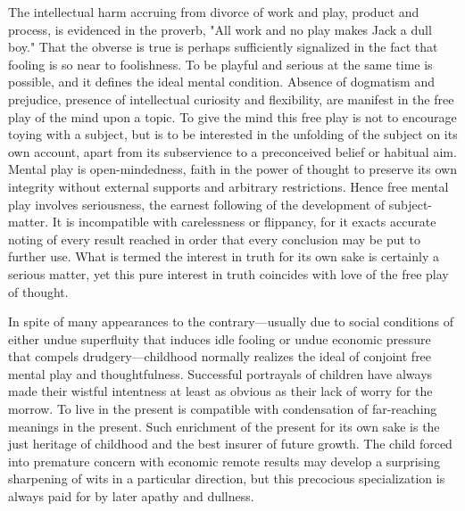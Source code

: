\documentclass[letterpaper]{book}
\begin{document}



The intellectual harm accruing from divorce of work and play, product
and process, is evidenced in the proverb, "All work and no play makes
Jack a dull boy." That the obverse is true is perhaps sufficiently
signalized in the fact that fooling is so near to foolishness. To be
playful and serious at the same time is possible, and it defines the
ideal mental condition. Absence of dogmatism and prejudice, presence of
intellectual curiosity and flexibility, are manifest in the free play of
the mind upon a topic. To give the mind
this
free play is not to encourage toying with a subject, but is to be
interested in the unfolding of the subject on its own account, apart
from its subservience to a preconceived belief or habitual aim. Mental
play is open-mindedness, faith in the power of thought to preserve its
own integrity without external supports and arbitrary restrictions.
Hence free mental play involves seriousness, the earnest following of
the development of subject-matter. It is incompatible with carelessness
or flippancy, for it exacts accurate noting of every result reached in
order that every conclusion may be put to further use. What is termed
the interest in truth for its own sake is certainly a serious matter,
yet this pure interest in truth coincides with love of the free play of
thought.

In spite of many appearances to the contrary---usually due to social
conditions of either undue superfluity that induces idle fooling or
undue economic pressure that compels drudgery---childhood normally
realizes the ideal of conjoint free mental play and thoughtfulness.
Successful portrayals of children have always made their wistful
intentness at least as obvious as their lack of worry for the morrow. To
live in the present is compatible with condensation of far-reaching
meanings in the present. Such enrichment of the present for its own sake
is the just heritage of childhood and the best insurer of future growth.
The child forced into premature concern with economic remote results may
develop a surprising sharpening of wits in a particular direction, but
this precocious specialization is always paid for by later apathy and
dullness.

\end{document}
